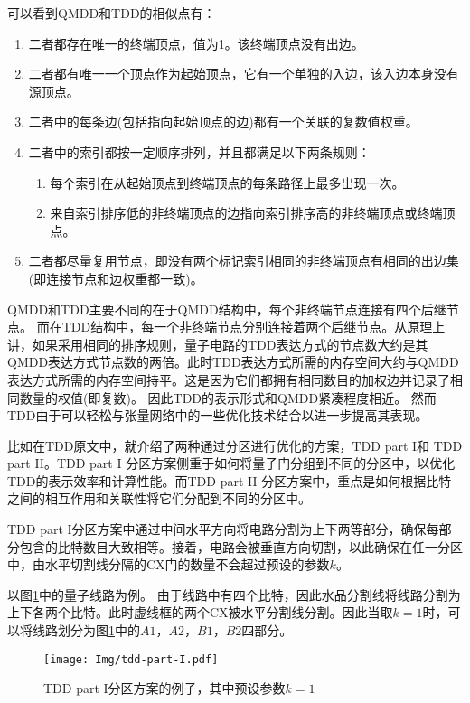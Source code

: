 可以看到QMDD和TDD的相似点有：
\begin{enumerate}
    \item 二者都存在唯一的终端顶点，值为1。该终端顶点没有出边。
    \item 二者都有唯一一个顶点作为起始顶点，它有一个单独的入边，该入边本身没有源顶点。
    \item 二者中的每条边(包括指向起始顶点的边)都有一个关联的复数值权重。
    \item 二者中的索引都按一定顺序排列，并且都满足以下两条规则：
    \begin{enumerate}[label=\roman*)]
        \item 每个索引在从起始顶点到终端顶点的每条路径上最多出现一次。
        \item 来自索引排序低的非终端顶点的边指向索引排序高的非终端顶点或终端顶点。
    \end{enumerate}
    \item 二者都尽量复用节点，即没有两个标记索引相同的非终端顶点有相同的出边集(即连接节点和边权重都一致)。
\end{enumerate}

QMDD和TDD主要不同的在于QMDD结构中，每个非终端节点连接有四个后继节点。
而在TDD结构中，每一个非终端节点分别连接着两个后继节点。从原理上讲，如果采用相同的排序规则，量子电路的TDD表达方式的节点数大约是其QMDD表达方式节点数的两倍。此时TDD表达方式所需的内存空间大约与QMDD表达方式所需的内存空间持平。这是因为它们都拥有相同数目的加权边并记录了相同数量的权值(即复数)。
因此TDD的表示形式和QMDD紧凑程度相近。
然而TDD由于可以轻松与张量网络中的一些优化技术结合以进一步提高其表现。

比如在TDD原文中\citep{Hong_2022}，就介绍了两种通过分区进行优化的方案，TDD part I和 TDD part II。TDD part I 分区方案侧重于如何将量子门分组到不同的分区中，以优化TDD的表示效率和计算性能。而TDD part II 分区方案中，重点是如何根据比特之间的相互作用和关联性将它们分配到不同的分区中。

TDD part I分区方案中通过中间水平方向将电路分割为上下两等部分，确保每部分包含的比特数目大致相等。接着，电路会被垂直方向切割，以此确保在任一分区中，由水平切割线分隔的CX门的数量不会超过预设的参数$k$。
\begin{example}
    以图\ref{fig:tdd-part-I}中的量子线路为例。
由于线路中有四个比特，因此水品分割线将线路分割为上下各两个比特。此时虚线框的两个CX被水平分割线分割。因此当取\(k=1\)时，可以将线路划分为图\ref{fig:tdd-part-I}中的\(A1\)，\(A2\)，\(B1\)，\(B2\)四部分。
\begin{figure}[!htbp]
    \centering
    \texttt{[image: Img/tdd-part-I.pdf]}
    \caption{TDD part I分区方案的例子，其中预设参数\(k=1\)}
    \label{fig:tdd-part-I}
\end{figure}
\end{example}

